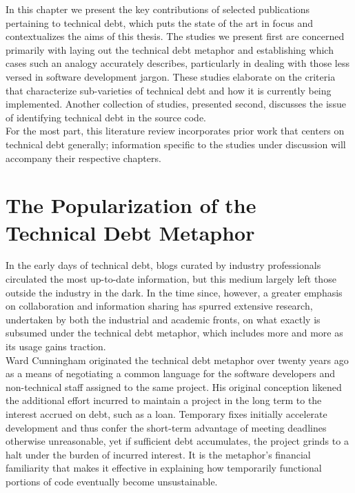 



In this chapter we present the key contributions of selected publications pertaining to technical debt, which puts the state of the art in focus and contextualizes the aims of this thesis.  The studies we present first are concerned primarily with laying out the technical debt metaphor and establishing which cases such an analogy accurately describes, particularly in dealing with those less versed in software development jargon.  These studies elaborate on the criteria that characterize sub-varieties of technical debt and how it is currently being implemented.  Another collection of studies, presented second, discusses the issue of identifying technical debt in the source code.\\

For the most part, this literature review incorporates prior work that centers on technical debt generally; information specific to the studies under discussion will accompany their respective chapters.


\section{The Popularization of the Technical Debt Metaphor}

In the early days of technical debt, blogs curated by industry professionals circulated the most up-to-date information, but this medium largely left those outside the industry in the dark. \revision In the time since, however, a greater emphasis on collaboration and information sharing has spurred extensive research, undertaken by both the industrial and academic fronts, on what exactly is subsumed under the technical debt metaphor, which includes more and more as its usage gains traction.\\

Ward Cunningham \cite{cunningham1993wycash} originated the technical debt metaphor over twenty years ago as a means of negotiating a common language for the software developers and non-technical staff assigned to the same project. His original conception likened the additional effort incurred to maintain a project in the long term to the interest accrued on debt, such as a loan. Temporary fixes initially accelerate development and thus confer the short-term advantage of meeting deadlines otherwise unreasonable, yet if sufficient debt accumulates, the project grinds to a halt under the burden of incurred interest. It is the metaphor's financial familiarity that makes it effective in explaining how temporarily functional portions of code eventually become unsustainable.\\

